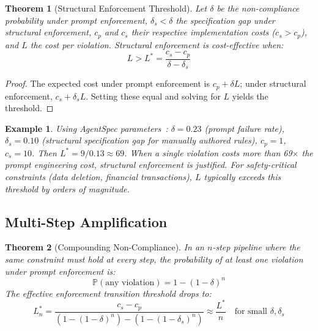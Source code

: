 \documentclass[11pt, a4paper, copyright]{googledeepmind}
\newtheorem{theorem}{Theorem}[section]
\newtheorem{example}{Example}[section]
\newcommand{\Prob}{\mathbb{P}}
\begin{document}
\begin{theorem}[Structural Enforcement Threshold]
\label{thm:threshold}
Let $\delta$ be the non-compliance probability under prompt enforcement, $\delta_s < \delta$ the specification gap under structural enforcement, $c_p$ and $c_s$ their respective implementation costs ($c_s > c_p$), and $L$ the cost per violation.
Structural enforcement is cost-effective when:
\begin{equation}
L > L^* = \frac{c_s - c_p}{\delta - \delta_s}
\end{equation}
\end{theorem}

\begin{proof}
The expected cost under prompt enforcement is $c_p + \delta L$; under structural enforcement, $c_s + \delta_s L$.
Setting these equal and solving for $L$ yields the threshold.
\end{proof}

\begin{example}
Using AgentSpec parameters~\citep{wang2026agentspec}: $\delta = 0.23$ (prompt failure rate), $\delta_s = 0.10$ (structural specification gap for manually authored rules), $c_p = 1$, $c_s = 10$.
Then $L^* = 9/0.13 \approx 69$.
When a single violation costs more than 69$\times$ the prompt engineering cost, structural enforcement is justified.
For safety-critical constraints (data deletion, financial transactions), $L$ typically exceeds this threshold by orders of magnitude.
\end{example}

\subsection{Multi-Step Amplification}

\begin{theorem}[Compounding Non-Compliance]
\label{thm:compounding}
In an $n$-step pipeline where the same constraint must hold at every step, the probability of at least one violation under prompt enforcement is:
\begin{equation}
\Prob(\text{any violation}) = 1 - (1 - \delta)^n
\end{equation}
The effective enforcement transition threshold drops to:
\begin{equation}
L_n^* = \frac{c_s - c_p}{(1 - (1-\delta)^n) - (1 - (1-\delta_s)^n)} \approx \frac{L^*}{n} \quad \text{for small } \delta, \delta_s
\end{equation}
\end{theorem}
\end{document}
